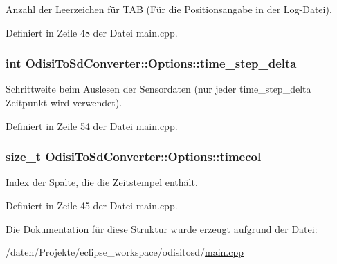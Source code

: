 Anzahl der Leerzeichen für T\-A\-B (Für die Positionsangabe in der Log-\/\-Datei). 



Definiert in Zeile 48 der Datei main.\-cpp.

\hypertarget{structOdisiToSdConverter_1_1Options_a2e5c6038a0ff5ca7d32be89740b82aa4}{
\subsubsection[{time\-\_\-step\-\_\-delta}]{\setlength{\rightskip}{0pt plus 5cm}int Odisi\-To\-Sd\-Converter\-::\-Options\-::time\-\_\-step\-\_\-delta}}\label{structOdisiToSdConverter_1_1Options_a2e5c6038a0ff5ca7d32be89740b82aa4}


Schrittweite beim Auslesen der Sensordaten (nur jeder time\-\_\-step\-\_\-delta Zeitpunkt wird verwendet). 



Definiert in Zeile 54 der Datei main.\-cpp.

\hypertarget{structOdisiToSdConverter_1_1Options_a43e744e0769d2b436c56ee6a9e410613}{
\subsubsection[{timecol}]{\setlength{\rightskip}{0pt plus 5cm}size\-\_\-t Odisi\-To\-Sd\-Converter\-::\-Options\-::timecol}}\label{structOdisiToSdConverter_1_1Options_a43e744e0769d2b436c56ee6a9e410613}


Index der Spalte, die die Zeitstempel enthält. 



Definiert in Zeile 45 der Datei main.\-cpp.



Die Dokumentation für diese Struktur wurde erzeugt aufgrund der Datei\-:\begin{DoxyCompactItemize}
\item 
/daten/\-Projekte/eclipse\-\_\-workspace/odisitosd/\hyperlink{odisitosd_2main_8cpp}{main.\-cpp}\end{DoxyCompactItemize}
